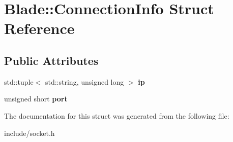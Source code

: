 \hypertarget{struct_blade_1_1_connection_info}{}\section{Blade\+:\+:Connection\+Info Struct Reference}
\label{struct_blade_1_1_connection_info}
\subsection*{Public Attributes}
\begin{DoxyCompactItemize}
\item 
\mbox{\label{struct_blade_1_1_connection_info_ac7dcddc9adff5893212ccf257589beb7}} 
std\+::tuple$<$ std\+::string, unsigned long $>$ {\bfseries ip}
\item 
\mbox{\label{struct_blade_1_1_connection_info_adc1c57992e467d1356080b166659a3fd}} 
unsigned short {\bfseries port}
\end{DoxyCompactItemize}


The documentation for this struct was generated from the following file\+:\begin{DoxyCompactItemize}
\item 
include/socket.\+h\end{DoxyCompactItemize}
